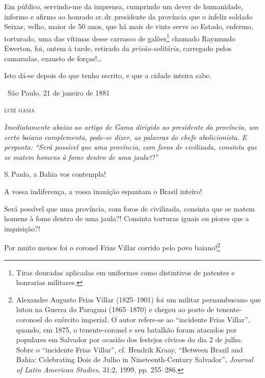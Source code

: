 {Em público, servindo-me da imprensa, cumprindo um dever de humanidade,
informo e afirmo ao honrado sr.\,dr.\,presidente da província que o
infeliz soldado Seixas, velho, maior de 50 anos, que há mais de vinte
serve ao Estado, enfermo, torturado, uma das vítimas desse carrasco de
galões\footnote{Tiras douradas aplicadas em uniformes como distintivos
  de patentes e honrarias militares.}
chamado Raymundo Ewerton,
foi, ontem à tarde, retirado da \emph{prisão-solitária}, carregado pelos
camaradas, exausto de forças!\ldots{}

Isto dá-se depois do que tenho escrito, e que a cidade inteira sabe.

\medskip
\hfill\ São Paulo, 21 de janeiro de 1881

\hfill\textsc{luiz gama}


\begin{resumo}
\emph{Imediatamente abaixo ao artigo de Gama dirigido ao presidente da
província, um certo baiano complementa, pode-se dizer, as palavras do
chefe abolicionista. E pergunta: ``Será possível que uma província, com
foros de civilizada, consinta que se matem homens à fome dentro de uma
jaula?!'' }
\end{resumo}

S.\,Paulo, a Bahia vos contempla!

A vossa indiferença, a vossa inanição espantam o Brasil inteiro!

Será possível que uma província, com foros de civilizada, consinta que
se matem homens à fome dentro de uma jaula?! Consinta torturas iguais ou
piores que a inquisição?!

Por muito menos foi o coronel Frias Villar corrido pelo povo
baiano!\footnote{Alexandre Augusto Frias Villar (1825--1901) foi um
  militar pernambucano que lutou na Guerra do Paraguai (1865--1870) e
  chegou ao posto de tenente-coronoel do exército imperial. O autor
  refere-se ao ``incidente Frias Villar'', quando, em 1875, o
  tenente-coronel e seu batalhão foram atacados por populares em
  Salvador por ocasião dos festejos cívicos do dia 2 de julho. Sobre
  o ``incidente Frias Villar'', cf. Hendrik Kraay, ``Between Brazil and
  Bahia: Celebrating Dois de Julho in Nineteenth-Century Salvador'',
  \emph{Journal of Latin American Studies,} 31:2, 1999, pp. 255--286.}

}
